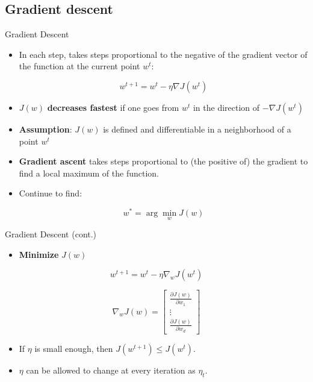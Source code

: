 \documentclass[serif, aspectratio=169]{beamer}
\begin{document}
\subsection{Gradient descent}
\begin{frame}{Gradient Descent}

\begin{itemize}
    \item In each step, takes steps proportional to the negative of the gradient vector of the function at the current point \( w^t \):
    
    \[
    w^{t+1} = w^t - \eta \nabla J(w^t)
    \]
    
    \item \( J(w) \) \textbf{decreases fastest} if one goes from \( w^t \) in the direction of \( -\nabla J(w^t) \)
    
    \item \textbf{Assumption}: \( J(w) \) is defined and differentiable in a neighborhood of a point \( w^t \)
    
    \item \textbf{Gradient ascent} takes steps proportional to (the positive of) the gradient to find a local maximum of the function.
    
    \item Continue to find:
    
    \[
    w^* = \arg \min_w J(w)
    \]

\end{itemize}

\end{frame}

\begin{frame}{Gradient Descent (cont.)}

\begin{itemize}
    \item \textbf{Minimize} \( J(w) \)
\end{itemize}

\[
w^{t+1} = w^t - \eta \nabla_w J(w^t)
\]

\[
\nabla_w J(w) = 
\begin{bmatrix}
    \frac{\partial J(w)}{\partial w_1} \\
    \vdots \\
    \frac{\partial J(w)}{\partial w_d}
\end{bmatrix}
\]

\begin{itemize}
    \item If \( \eta \) is small enough, then \( J(w^{t+1}) \leq J(w^t) \).
    \item \( \eta \) can be allowed to change at every iteration as \( \eta_t \).
\end{itemize}

\end{frame}
\end{document}
